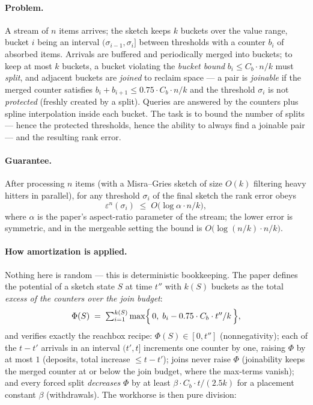 \paragraph{Problem.}
A stream of $n$ items arrives; the sketch keeps $k$ buckets over the value
range, bucket $i$ being an interval $(\sigma_{i-1}, \sigma_i]$ between
thresholds with a counter $b_i$ of absorbed items. Arrivals are buffered
and periodically merged into buckets; to keep at most $k$ buckets, a bucket
violating the \emph{bucket bound} $b_i \le C_b \cdot n/k$ must \emph{split},
and adjacent buckets are \emph{joined} to reclaim space --- a pair is
\emph{joinable} if the merged counter satisfies $b_i + b_{i+1} \le 0.75
\cdot C_b \cdot n/k$ and the threshold $\sigma_i$ is not \emph{protected}
(freshly created by a split). Queries are answered by the counters plus
spline interpolation inside each bucket. The task is to bound the number
of splits --- hence the protected thresholds, hence the ability to always
find a joinable pair --- and the resulting rank error.

\paragraph{Guarantee.}

\begin{theorem}\label{thm:amo-spline-error}
After processing $n$ items (with a Misra--Gries sketch of size $O(k)$
filtering heavy hitters in parallel), for any threshold $\sigma_i$ of the
final sketch the rank error obeys
\[
\varepsilon^{n}(\sigma_i) \;\le\; O\bigl(\log \alpha \cdot n/k\bigr),
\]
where $\alpha$ is the paper's aspect-ratio parameter of the stream; the
lower error is symmetric, and in the mergeable setting the bound is
$O\bigl(\log (n/k) \cdot n/k\bigr)$. \eop
\end{theorem}

\paragraph{How amortization is applied.}
Nothing here is random --- this is deterministic bookkeeping. The paper
defines the potential of a sketch state $S$ at time $t''$ with $k(S)$ buckets
as the total \emph{excess of the counters over the join budget}:
\[
\Phi(S) \;=\; \textstyle\sum_{i=1}^{k(S)} \max\Bigl\{\,0,\;
b_i - 0.75 \cdot C_b \cdot t''/k \,\Bigr\},
\]
and verifies exactly the reachbox recipe: $\Phi(S) \in [0, t'']$
(nonnegativity); each of the $t - t'$ arrivals in an interval $(t', t]$
increments one counter by one, raising $\Phi$ by at most $1$ (deposits,
total increase $\le t - t'$); joins never raise $\Phi$ (joinability keeps
the merged counter at or below the join budget, where the max-terms
vanish); and every forced split \emph{decreases} $\Phi$ by at least
$\beta \cdot C_b \cdot t / (2.5 k)$ for a placement constant $\beta$
(withdrawals). The workhorse is then pure division:

